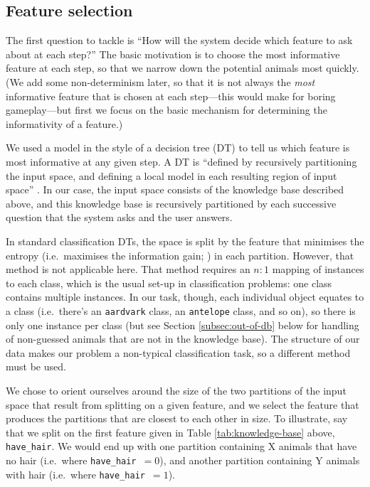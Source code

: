 \documentclass[11pt,a4paper]{article}
\newcommand{\havehair}{\texttt{have\_hair}}
\begin{document}
\subsection{Feature selection}
\label{subsec:featselec}

The first question to tackle is ``How will the system decide which feature to ask about at each step?''
The basic motivation is to choose the most informative feature at each step, so that we narrow down the potential animals most quickly.
(We add some non-determinism later, so that it is not always the \textit{most} informative feature that is chosen at each step---this would make for boring gameplay---but first we focus on the basic mechanism for determining the informativity of a feature.)

We used a model in the style of a decision tree (DT) to tell us which feature is most informative at any given step.
A DT is ``defined by recursively partitioning the input space, and defining a local model in each resulting region of input space'' \citep[545]{Murphy2012}.
In our case, the input space consists of the knowledge base described above, and this knowledge base is recursively partitioned by each successive question that the system asks and the user answers.

In standard classification DTs, the space is split by the feature that minimises the entropy (i.e.\ maximises the information gain; \citealt{Quinlan1986}) in each partition.
However, that method is not applicable here.
That method requires an $n : 1$ mapping of instances to each class, which is the usual set-up in classification problems: one class contains multiple instances.
In our task, though, each individual object equates to a class (i.e.\ there's an \texttt{aardvark} class, an \texttt{antelope} class, and so on), so there is only one instance per class (but see Section \ref{subsec:out-of-db} below for handling of non-guessed animals that are not in the knowledge base).
The structure of our data makes our problem a non-typical classification task, so a different method must be used.

We chose to orient ourselves around the size of the two partitions of the input space that result from splitting on a given feature, and we select the feature that produces the partitions that are closest to each other in size.
To illustrate, say that we split on the first feature given in Table \ref{tab:knowledge-base} above, \havehair.
We would end up with one partition containing X animals that have no hair (i.e.\ where \havehair\ $= 0$), and another partition containing Y animals with hair (i.e.\ where \havehair\ $= 1$).
\end{document}

